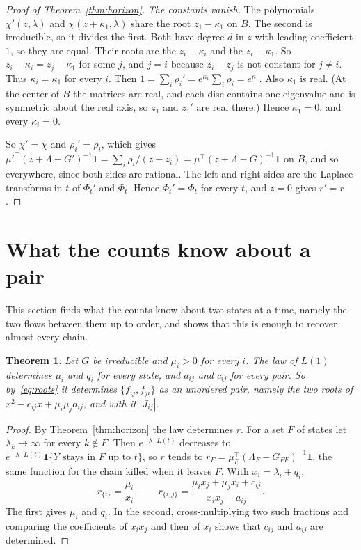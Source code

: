 \documentclass[11pt]{article}
\newtheorem{theorem}{Theorem}[section]
\theoremstyle{definition}
\theoremstyle{remark}
\newcommand{\one}{\mathbf 1}
\begin{document}
\begin{proof}[Proof of Theorem~\ref{thm:horizon}]
\emph{The constants vanish.} The polynomials $\chi'(z,\lambda)$ and
$\chi(z+\kappa_1,\lambda)$ share the root $z_1-\kappa_1$ on $B$. The second is
irreducible, so it divides the first. Both have degree $d$ in $z$ with leading
coefficient $1$, so they are equal. Their roots are the $z_i-\kappa_i$ and the
$z_i-\kappa_1$. So $z_i-\kappa_i=z_j-\kappa_1$ for some $j$, and $j=i$ because
$z_i-z_j$ is not constant for $j\ne i$. Thus $\kappa_i=\kappa_1$ for every $i$.
Then $1=\sum_i\rho_i'=e^{\kappa_1}\sum_i\rho_i=e^{\kappa_1}$. Also $\kappa_1$ is
real. (At the center of $B$ the matrices are real, and each disc contains one
eigenvalue and is symmetric about the real axis, so $z_1$ and $z_1'$ are real
there.) Hence $\kappa_1=0$, and every $\kappa_i=0$.

So $\chi'=\chi$ and $\rho_i'=\rho_i$, which gives
$\mu'^{\top}(z+\Lambda-G')^{-1}\one=\sum_i\rho_i/(z-z_i)=\mu^{\top}(z+\Lambda-G)^{-1}\one$
on $B$, and so everywhere, since both sides are rational. The left and right
sides are the Laplace transforms in $t$ of $\Phi_t'$ and $\Phi_t$. Hence
$\Phi_t'=\Phi_t$ for every $t$, and $z=0$ gives $r'=r$.
\end{proof}

\section{What the counts know about a pair}\label{sec:pairs}

This section finds what the counts know about two states at a time, namely the
two flows between them up to order, and shows that this is enough to recover
almost every chain.

\begin{theorem}\label{thm:pairs}
Let $G$ be irreducible and $\mu_i>0$ for every $i$. The law of $L(1)$ determines
$\mu_i$ and $q_i$ for every state, and $a_{ij}$ and $c_{ij}$ for every pair. So
by~\eqref{eq:roots} it determines $\{f_{ij},f_{ji}\}$ as an unordered pair,
namely the two roots of $x^2-c_{ij}x+\mu_i\mu_ja_{ij}$, and with it $|J_{ij}|$.
\end{theorem}
\begin{proof}
By Theorem~\ref{thm:horizon} the law determines $r$. For a set $F$ of states let
$\lambda_k\to\infty$ for every $k\notin F$. Then $e^{-\lambda\cdot L(t)}$
decreases to $e^{-\lambda\cdot L(t)}\one\{Y\text{ stays in }F\text{ up to }t\}$,
so $r$ tends to $r_F=\mu_F^{\top}(\Lambda_F-G_{FF})^{-1}\one$, the same function
for the chain killed when it leaves $F$. With $x_i=\lambda_i+q_i$,
\[
r_{\{i\}}=\frac{\mu_i}{x_i},\qquad
r_{\{i,j\}}=\frac{\mu_ix_j+\mu_jx_i+c_{ij}}{x_ix_j-a_{ij}} .
\]
The first gives $\mu_i$ and $q_i$. In the second, cross-multiplying two such
fractions and comparing the coefficients of $x_ix_j$ and then of $x_i$ shows
that $c_{ij}$ and $a_{ij}$ are determined.
\end{proof}
\end{document}
